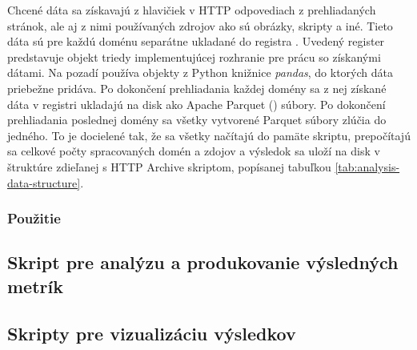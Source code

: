 Chcené dáta sa získavajú z hlavičiek v HTTP odpovediach z prehliadaných stránok, ale aj z nimi používaných zdrojov ako sú obrázky, skripty a iné.
Tieto dáta sú pre každú doménu separátne ukladané do registra .
Uvedený register predstavuje objekt triedy implementujúcej rozhranie pre prácu so získanými dátami. 
Na pozadí používa  objekty z Python knižnice \textit{pandas}, do ktorých dáta priebežne pridáva.
Po dokončení prehliadania každej domény sa z nej získané dáta v registri ukladajú na disk ako Apache Parquet () súbory.
Po dokončení prehliadania poslednej domény sa všetky vytvorené Parquet súbory zlúčia do jedného.
To je docielené tak, že sa všetky načítajú do pamäte skriptu, prepočítajú sa celkové počty spracovaných domén a zdojov a výsledok sa uloží na disk v štruktúre zdieľanej s HTTP Archive skriptom, popísanej tabuľkou \ref{tab:analysis-data-structure}.

\subsubsection{Použitie}

\subsection{Skript pre analýzu a produkovanie výsledných metrík}
\subsection{Skripty pre vizualizáciu výsledkov}

